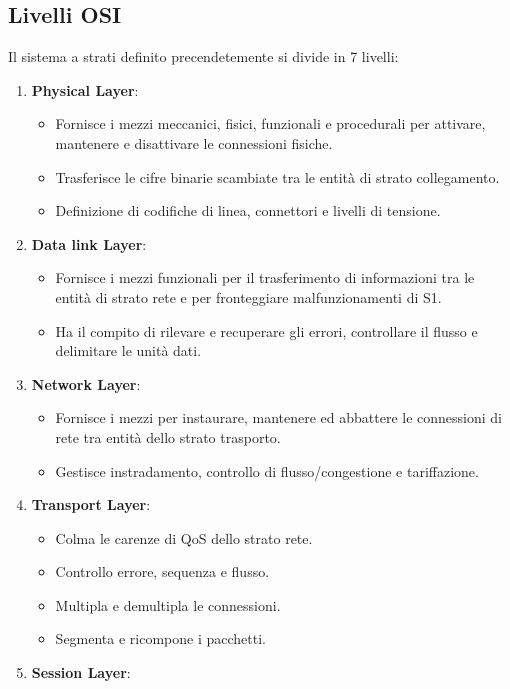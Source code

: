 \documentclass[12pt]{article}
\begin{document}
\subsection{Livelli OSI}
Il sistema a strati definito precendetemente si divide in 7 livelli:
\begin{enumerate}
  \item \textbf{Physical Layer}:
  \begin{itemize}
    \item Fornisce i mezzi meccanici, fisici, funzionali e procedurali per attivare, mantenere e disattivare le connessioni fisiche.
    \item Trasferisce le cifre binarie scambiate tra le entità di strato collegamento.
    \item Definizione di codifiche di linea, connettori e livelli di tensione.
  \end{itemize}
  \item \textbf{Data link Layer}:
  \begin{itemize}
    \item Fornisce i mezzi funzionali per il trasferimento di informazioni tra le entità di strato rete e per fronteggiare malfunzionamenti di S1.
    \item Ha il compito di rilevare e recuperare gli errori, controllare il flusso e delimitare le unità dati.
  \end{itemize}
  \item \textbf{Network Layer}:
    \begin{itemize}
      \item Fornisce i mezzi per instaurare, mantenere ed abbattere le connessioni di rete tra entità dello strato trasporto.
      \item Gestisce instradamento, controllo di flusso/congestione e tariffazione.
    \end{itemize}
  \item \textbf{Transport Layer}:
    \begin{itemize}
      \item Colma le carenze di QoS dello strato rete.
      \item Controllo errore, sequenza e flusso.
      \item Multipla e demultipla le connessioni.
      \item Segmenta e ricompone i pacchetti.
    \end{itemize}
  \item \textbf{Session Layer}:
    \begin{itemize}

\end{itemize}
\end{enumerate}
\end{document}
